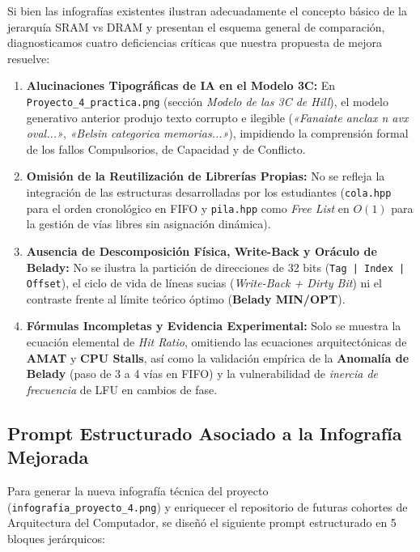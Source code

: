 \documentclass[11pt,letterpaper]{article}
\begin{document}
Si bien las infografías existentes ilustran adecuadamente el concepto básico de la jerarquía SRAM vs DRAM y presentan el esquema general de comparación, diagnosticamos cuatro deficiencias críticas que nuestra propuesta de mejora resuelve:
\begin{enumerate}
    \item \textbf{Alucinaciones Tipográficas de IA en el Modelo 3C:} En \texttt{Proyecto\_4\_practica.png} (sección \textit{Modelo de las 3C de Hill}), el modelo generativo anterior produjo texto corrupto e ilegible (\textit{«Fanaiate anclax n avx oval...»}, \textit{«Belsin categorica memorias...»}), impidiendo la comprensión formal de los fallos Compulsorios, de Capacidad y de Conflicto.
    \item \textbf{Omisión de la Reutilización de Librerías Propias:} No se refleja la integración de las estructuras desarrolladas por los estudiantes (\texttt{cola.hpp} para el orden cronológico en FIFO y \texttt{pila.hpp} como \textit{Free List} en $O(1)$ para la gestión de vías libres sin asignación dinámica).
    \item \textbf{Ausencia de Descomposición Física, Write-Back y Oráculo de Belady:} No se ilustra la partición de direcciones de 32 bits (\texttt{Tag | Index | Offset}), el ciclo de vida de líneas sucias (\textit{Write-Back + Dirty Bit}) ni el contraste frente al límite teórico óptimo (\textbf{Belady MIN/OPT}).
    \item \textbf{Fórmulas Incompletas y Evidencia Experimental:} Solo se muestra la ecuación elemental de \textit{Hit Ratio}, omitiendo las ecuaciones arquitectónicas de \textbf{AMAT} y \textbf{CPU Stalls}, así como la validación empírica de la \textbf{Anomalía de Belady} (paso de 3 a 4 vías en FIFO) y la vulnerabilidad de \textit{inercia de frecuencia} de LFU en cambios de fase.
\end{enumerate}

\subsection{Prompt Estructurado Asociado a la Infografía Mejorada}
Para generar la nueva infografía técnica del proyecto (\texttt{infografia\_proyecto\_4.png}) y enriquecer el repositorio de futuras cohortes de Arquitectura del Computador, se diseñó el siguiente prompt estructurado en 5 bloques jerárquicos:
\end{document}
